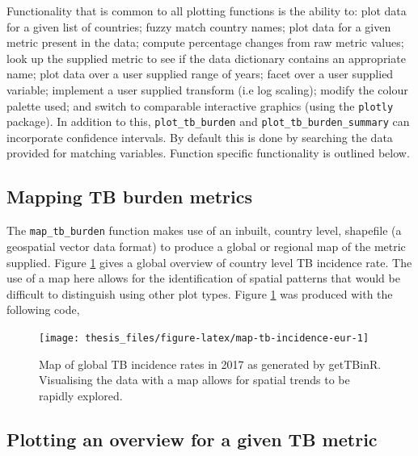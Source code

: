 \documentclass[11pt,twoside]{bristolthesis}
\begin{document}
  Functionality that is common to all plotting functions is the ability to: plot data for a given list of countries; fuzzy match country names; plot data for a given metric present in the data; compute percentage changes from raw metric values; look up the supplied metric to see if the data dictionary contains an appropriate name; plot data over a user supplied range of years; facet over a user supplied variable; implement a user supplied transform (i.e log scaling); modify the colour palette used; and switch to comparable interactive graphics (using the \texttt{plotly} package). In addition to this, \texttt{plot\_tb\_burden} and \texttt{plot\_tb\_burden\_summary} can incorporate confidence intervals. By default this is done by searching the data provided for matching variables. Function specific functionality is outlined below.
  
  \hypertarget{mapping-tb-burden-metrics}{%
  \subsection{Mapping TB burden metrics}\label{mapping-tb-burden-metrics}}
  
  The \texttt{map\_tb\_burden} function makes use of an inbuilt, country level, shapefile (a geospatial vector data format) to produce a global or regional map of the metric supplied. Figure \ref{fig:map-tb-incidence-eur} gives a global overview of country level TB incidence rate. The use of a map here allows for the identification of spatial patterns that would be difficult to distinguish using other plot types. Figure \ref{fig:map-tb-incidence-eur} was produced with the following code,
  \begin{Shaded}
  \begin{Highlighting}[]
  \NormalTok{(} \NormalTok{, } \NormalTok{) }\OperatorTok{+}
  \StringTok{  }\NormalTok{(} \NormalTok{(} \NormalTok{))}
  \end{Highlighting}
  \end{Shaded}
  \begin{figure}
  
  {\centering \texttt{[image: thesis\_files/figure-latex/map-tb-incidence-eur-1]} 
  
  }
  
  \caption[Map of global TB incidence rates in 2017 as generated by getTBinR.]{Map of global TB incidence rates in 2017 as generated by getTBinR. Visualising the data with a map allows for spatial trends to be rapidly explored.}\label{fig:map-tb-incidence-eur}
  \end{figure}
  \hypertarget{plotting-an-overview-for-a-given-tb-metric}{%
  \subsection{Plotting an overview for a given TB metric}\label{plotting-an-overview-for-a-given-tb-metric}}
  
\end{document}
